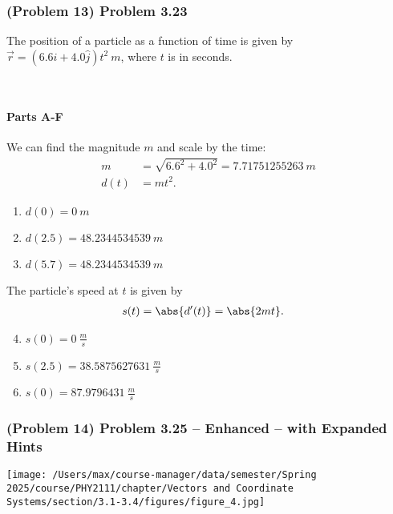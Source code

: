 \newpage

\subsubsection{(Problem 13) Problem 3.23}

The position of a particle as a function of time is given by $\vec{r} = \left( 6.6 \hat{i} + 4.0 \hat{j} \right)t^2 \SI{}{m}$, where $t$ is in seconds.

~

\setcounter{partcounter}{6}
\paragraph{Parts A-F}

\begin{solution}
	We can find the magnitude $m$ and scale by the time:
	\begin{align*}
		m &= \sqrt{6.6^2 + 4.0^2} = \SI{7.71751255263}{m} \\
		d(t) &= mt^2
		.\end{align*}
	\begin{enumerate}[label=\Alph*.]
		\item $d(0) = \SI{0}{m}$
		\item $d(2.5) = \SI{48.2344534539}{m}$
		\item $d(5.7) = \SI{48.2344534539}{m}$
	\end{enumerate}
	The particle's speed at $t$ is given by
	\begin{align*}
		s(t) &= \abs{ d'(t) } = \abs{ 2mt }
		.\end{align*}
	\begin{enumerate}[label=\Alph*.]
		\setcounter{enumi}{3}
		\item $s(0) = \SI{0}{\frac{m}{s}}$
		\item $s(2.5) = \SI{38.5875627631}{\frac{m}{s}}$
		\item $s(0) = \SI{87.9796431}{\frac{m}{s}}$
	\end{enumerate}
\end{solution}

\newpage

\subsubsection{(Problem 14) Problem 3.25 -- Enhanced -- with Expanded Hints}

\begin{center}
	\texttt{[image: /Users/max/course-manager/data/semester/Spring 2025/course/PHY2111/chapter/Vectors and Coordinate Systems/section/3.1-3.4/figures/figure\_4.jpg]}
\end{center}


